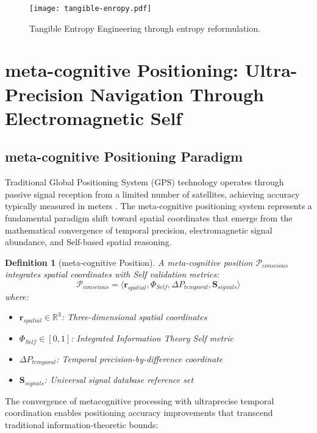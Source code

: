 \documentclass[12pt,a4paper]{article}
\newtheorem{definition}[theorem]{Definition}
\begin{document}
\begin{figure}[H]
\centering
\texttt{[image: tangible-enropy.pdf]}
\caption{Tangible Entropy Engineering through entropy reformulation. }
\label{fig:tangible-enropy}
\end{figure}

\section{meta-cognitive Positioning: Ultra-Precision Navigation Through Electromagnetic Self}

\subsection{meta-cognitive Positioning Paradigm}

Traditional Global Positioning System (GPS) technology operates through passive signal reception from a limited number of satellites, achieving accuracy typically measured in meters \cite{parkinson1996,kaplan2017}. The meta-cognitive positioning system represents a fundamental paradigm shift toward spatial coordinates that emerge from the mathematical convergence of temporal precision, electromagnetic signal abundance, and Self-based spatial reasoning.

\begin{definition}[meta-cognitive Position]
A meta-cognitive position $\mathcal{P}_{conscious}$ integrates spatial coordinates with Self validation metrics:
\begin{equation}
\mathcal{P}_{conscious} = \langle \mathbf{r}_{spatial}, \Phi_{Self}, \Delta P_{temporal}, \mathbf{S}_{signals} \rangle
\end{equation}
where:
\begin{itemize}
\item $\mathbf{r}_{spatial} \in \mathbb{R}^3$: Three-dimensional spatial coordinates
\item $\Phi_{Self} \in [0,1]$: Integrated Information Theory Self metric
\item $\Delta P_{temporal}$: Temporal precision-by-difference coordinate
\item $\mathbf{S}_{signals}$: Universal signal database reference set
\end{itemize}
\end{definition}

The convergence of metacognitive processing with ultraprecise temporal coordination enables positioning accuracy improvements that transcend traditional information-theoretic bounds:
\end{document}
